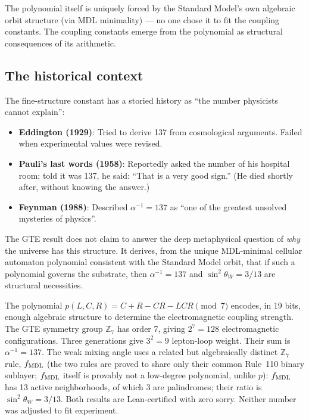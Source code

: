 \documentclass[11pt,a4paper]{article}
\newcommand{\sinwsq}{\sin^2\!\theta_W}
\newcommand{\ZS}{\mathbb{Z}_7}
\begin{document}
The polynomial itself is uniquely forced by the Standard Model's own
algebraic orbit structure (via MDL minimality) --- no one chose it
to fit the coupling constants.  The coupling constants emerge from the
polynomial as structural consequences of its arithmetic.

\subsection{The historical context}

The fine-structure constant has a storied history as ``the number physicists
cannot explain'':
\begin{itemize}
  \item \textbf{Eddington (1929)}: Tried to derive 137 from cosmological arguments.
        Failed when experimental values were revised.
  \item \textbf{Pauli's last words (1958)}: Reportedly asked the number of his
        hospital room; told it was 137, he said: ``That is a very good sign.''
        (He died shortly after, without knowing the answer.)
  \item \textbf{Feynman (1988)}: Described $\alpha^{-1} = 137$ as ``one of the
        greatest unsolved mysteries of physics''.
\end{itemize}

The GTE result does not claim to answer the deep metaphysical question of
\emph{why} the universe has this structure.  It derives, from the unique MDL-minimal
cellular automaton polynomial consistent with the Standard Model orbit, that if such
a polynomial governs the substrate, then $\alpha^{-1} = 137$ and $\sinwsq = 3/13$
are structural necessities.

\bigskip
\begin{tcolorbox}[colback=boxblue,colframe=blue!40!black,
  title=One-paragraph summary]
The polynomial $p(L,C,R) = C + R - CR - LCR \pmod 7$ encodes, in 19 bits,
enough algebraic structure to determine the electromagnetic coupling strength.
The GTE symmetry group $\ZS$ has order 7, giving $2^7 = 128$ electromagnetic
configurations.  Three generations give $3^2 = 9$ lepton-loop weight.  Their
sum is $\alpha^{-1} = 137$.  The weak mixing angle uses a related but
algebraically distinct $\mathbb{Z}_7$ rule, $f_{\rm MDL}$ (the two rules are
proved to share only their common Rule~110 binary sublayer; $f_{\rm MDL}$
itself is provably not a low-degree polynomial, unlike $p$): $f_{\rm MDL}$ has
13 active neighborhoods, of which 3 are palindromes; their ratio is
$\sinwsq = 3/13$.  Both results are Lean-certified with zero sorry.  Neither
number was adjusted to fit experiment.
\end{tcolorbox}
\end{document}
